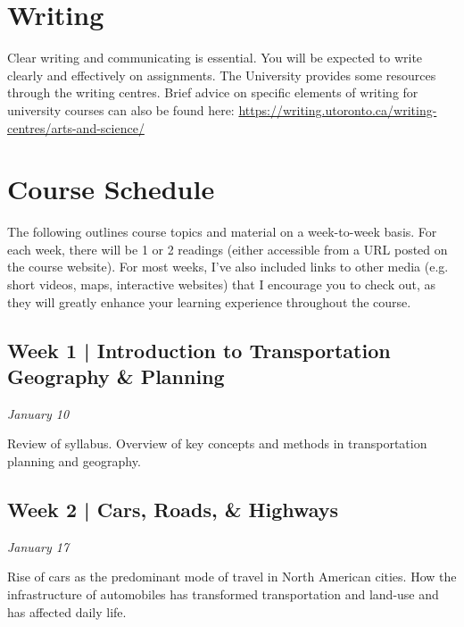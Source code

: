 \documentclass[11pt]{article}
\begin{document}
	
	\section*{Writing}
	
	Clear writing and communicating is essential. You will be expected to write clearly and effectively on
	assignments. The University provides some resources through the writing centres. Brief advice on
	specific elements of writing for university courses can also be found here:	
	\url{https://writing.utoronto.ca/writing-centres/arts-and-science/}
	


	\newpage
	
	\section*{Course Schedule}
	
	The following outlines course topics and material on a week-to-week basis. For each week, there will be 1 or 2  readings (either accessible from a URL posted on the course website). For most weeks, I've also included links to other media (e.g. short videos, maps, interactive websites) that I encourage you to check out, as they will greatly enhance your learning experience throughout the course.

	
	\subsection*{Week 1 | Introduction to Transportation Geography \& Planning}
	
	\textit{January 10}

	Review of syllabus. Overview of key concepts and methods in transportation planning and geography. 
	
	
	

	
		
	
	\subsection*{Week 2 | Cars, Roads, \& Highways}
	
	\textit{January 17}
	
	Rise of cars as the predominant mode of travel in North American cities. How the infrastructure of automobiles has transformed transportation and land-use and has affected daily life. 
	
\end{document}
